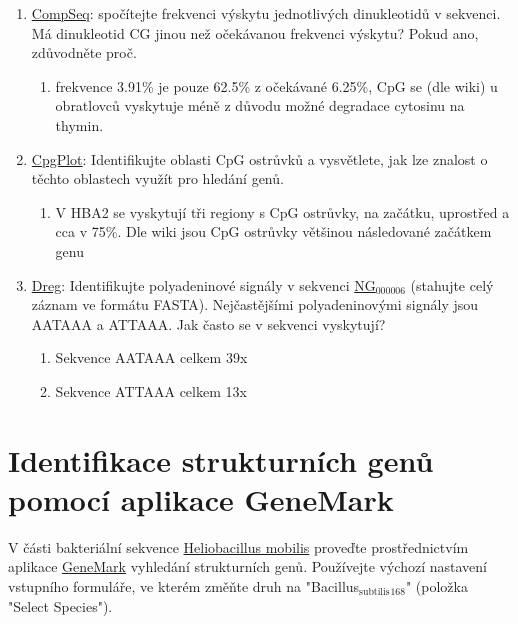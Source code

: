 \documentclass[11pt]{article}
\begin{document}
\begin{enumerate}
\item \href{http://emboss.bioinformatics.nl/cgi-bin/emboss/compseq}{CompSeq}: spočítejte frekvenci výskytu jednotlivých dinukleotidů v
sekvenci. Má dinukleotid CG jinou než očekávanou frekvenci výskytu? Pokud
ano, zdůvodněte proč.
\begin{enumerate}
\item frekvence 3.91\% je pouze 62.5\% z očekávané 6.25\%, CpG se (dle wiki) u
obratlovců vyskytuje méně z důvodu možné degradace cytosinu na thymin.
\end{enumerate}
\item \href{http://emboss.bioinformatics.nl/cgi-bin/emboss/cpgplot}{CpgPlot}: Identifikujte oblasti CpG ostrůvků a vysvětlete, jak lze znalost o
těchto oblastech využít pro hledání genů.
\begin{enumerate}
\item V HBA2 se vyskytují tři regiony s CpG ostrůvky, na začátku, uprostřed a
cca v 75\%. Dle wiki jsou CpG ostrůvky většinou následované začátkem genu
\end{enumerate}
\item \href{http://emboss.bioinformatics.nl/cgi-bin/emboss/dreg}{Dreg}: Identifikujte polyadeninové signály v sekvenci \href{http://www.ncbi.nlm.nih.gov/nuccore/NG\_000006.1}{NG\(_{\text{000006}}\)} (stahujte celý
záznam ve formátu FASTA). Nejčastějšími polyadeninovými signály jsou AATAAA a
ATTAAA. Jak často se v sekvenci vyskytují?
\begin{enumerate}
\item Sekvence AATAAA celkem 39x
\item Sekvence ATTAAA celkem 13x
\end{enumerate}
\end{enumerate}

\section{Identifikace strukturních genů pomocí aplikace GeneMark}
\label{sec:org0bfb85d}
V části bakteriální sekvence \href{./heliobacillus\_mobilis.txt}{Heliobacillus mobilis} proveďte prostřednictvím
aplikace \href{http://exon.biology.gatech.edu/gmchoice.html}{GeneMark} vyhledání strukturních genů. Používejte výchozí nastavení
vstupního formuláře, ve kterém změňte druh na "Bacillus\(_{\text{subtilis}}\)\(_{\text{168}}\)" (položka
"Select Species").
\end{document}
